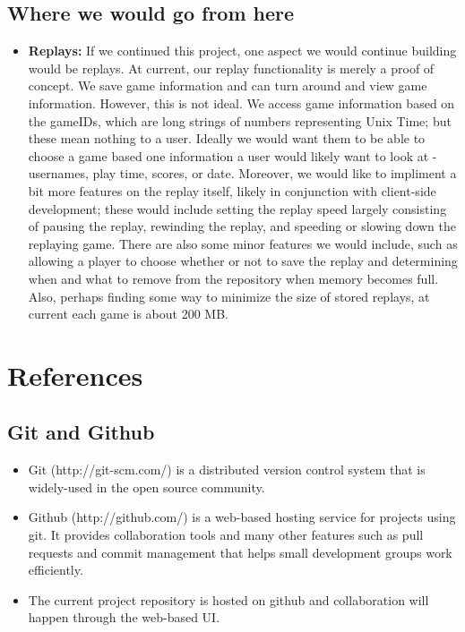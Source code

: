 \documentclass[letterpaper,12pt]{article}
\begin{document}
\subsection{Where we would go from here}
\begin{itemize}
\item \textbf {Replays:} If we continued this project, one aspect we would continue building would be replays. At current, our replay functionality is merely a proof of concept. We save game information and can turn around and view game information. However, this is not ideal. We access game information based on the gameIDs, which are long strings of numbers representing Unix Time; but these mean nothing to a user. Ideally we would want them to be able to choose a game based one information a user would likely want to look at - usernames, play time, scores, or date. Moreover, we would like to impliment a bit more features on the replay itself, likely in conjunction with client-side development; these would include setting the replay speed largely consisting of pausing the replay, rewinding the replay, and speeding or slowing down the replaying game. There are also some minor features we would include, such as allowing a player to choose whether or not to save the replay and determining when and what to remove from the repository when memory becomes full. Also, perhaps finding some way to minimize the size of stored replays, at current each game is about 200 MB. 
\end{itemize}


\section{References}
\subsection{Git and Github}
	\begin{itemize}
		\item Git (http://git-scm.com/) is a distributed version control system that is widely-used in the open source community.
		\item Github (http://github.com/) is a web-based hosting service for projects using git. It provides collaboration tools and many other features such as pull requests and commit management that helps small development groups work efficiently.
		\item The current project repository is hosted on github and collaboration will happen through the web-based UI.
	\end{itemize}
\end{document}
